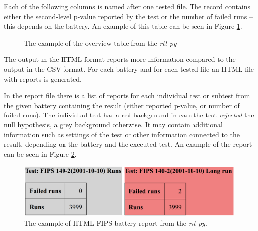 \documentclass[
  digital,     %
  oneside,     %
  nosansbold,  %
  nocolorbold, %
  nolof,         %
  nolot,         %
]{fithesis4}
\begin{document}
Each of the following columns is named after one tested file. The record contains either the second-level p-value reported by the test or the number of failed runs -- this depends on the battery. An example of this table can be seen in Figure \ref{fig:rtt_py_table}.

\begin{figure}
  \begin{center}
  \end{center}
  \caption{The example of the overview table from the \emph{rtt-py}}
  \label{fig:rtt_py_table}
\end{figure}


The output in the HTML format reports more information compared to the output in the CSV format. For each battery and for each tested file an HTML file with reports is generated.

In the report file there is a list of reports for each individual test or subtest from the given battery containing the result (either reported p-value, or number of failed runs). The individual test has a red background in case the test \emph{rejected} the null hypothesis, a grey background otherwise. It may contain additional information such as settings of the test or other information connected to the result, depending on the battery and the executed test. An example of the  report can be seen in Figure \ref{fig:rtt_py_html}.
\begin{figure}
  \begin{center}
    \includegraphics[width=12.5cm]{figures/rtt-py.png}
  \end{center}
  \caption{The example of HTML FIPS battery report from the \emph{rtt-py}.}
  \label{fig:rtt_py_html}
\end{figure}
\end{document}
